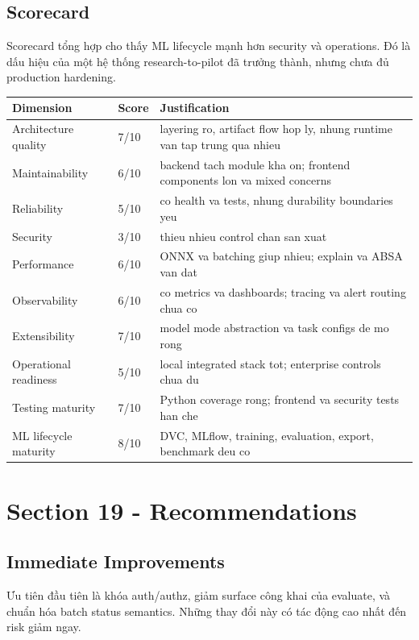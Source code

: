 \subsection{Scorecard}
Scorecard tổng hợp cho thấy ML lifecycle mạnh hơn security và operations. Đó là dấu hiệu của một hệ thống research-to-pilot đã trưởng thành, nhưng chưa đủ production hardening.

\begin{table}[H]
\centering
\begin{tabularx}{\textwidth}{@{}lP{1.5cm}X@{}}
\toprule
\textbf{Dimension} & \textbf{Score} & \textbf{Justification} \\
\midrule
Architecture quality & 7/10 & layering ro, artifact flow hop ly, nhung runtime van tap trung qua nhieu \\
Maintainability & 6/10 & backend tach module kha on; frontend components lon va mixed concerns \\
Reliability & 5/10 & co health va tests, nhung durability boundaries yeu \\
Security & 3/10 & thieu nhieu control chan san xuat \\
Performance & 6/10 & ONNX va batching giup nhieu; explain va ABSA van dat \\
Observability & 6/10 & co metrics va dashboards; tracing va alert routing chua co \\
Extensibility & 7/10 & model mode abstraction va task configs de mo rong \\
Operational readiness & 5/10 & local integrated stack tot; enterprise controls chua du \\
Testing maturity & 7/10 & Python coverage rong; frontend va security tests han che \\
ML lifecycle maturity & 8/10 & DVC, MLflow, training, evaluation, export, benchmark deu co \\
\bottomrule
\end{tabularx}
\end{table}

\section{Section 19 - Recommendations}
\subsection{Immediate Improvements}
Ưu tiên đầu tiên là khóa auth/authz, giảm surface công khai của evaluate, và chuẩn hóa batch status semantics. Những thay đổi này có tác động cao nhất đến risk giảm ngay.

